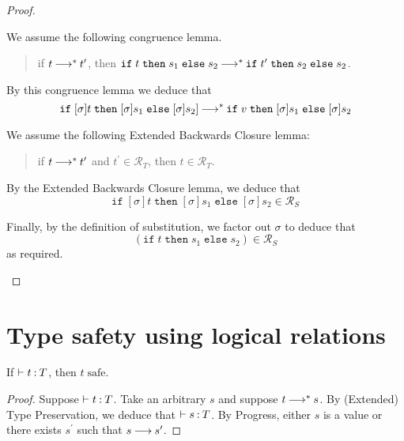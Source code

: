 \documentclass[11pt,letterpaper]{article}
\renewcommand{\R}{\mathcal{R}}
\newcommand{\ifthenelse}[3]{%
  \mathtt{if}\;#1\;\mathtt{then}\;#2\;\mathtt{else}\;#3%
}
\begin{document}
\begin{enumerate}
\begin{proof}
\begin{description}
          We assume the following congruence lemma.
          \begin{quote}
            if $t \mathbin{\longrightarrow}^* t^\prime$, then
            $\ifthenelse{t}{s_1}{s_2}
            \evalto^* \ifthenelse{t^\prime}{s_2}{s_2}$.
          \end{quote}

          By this congruence lemma we deduce that
          \begin{equation*}
            \ifthenelse{[\sigma]t}{[\sigma]s_1}{[\sigma]s_2]}
            \evalto^*
            \ifthenelse{v}{[\sigma]s_1}{[\sigma]s_2}
          \end{equation*}

          We assume the following Extended Backwards Closure lemma:
          \begin{quote}
            if $t \mathbin{\longrightarrow}^* t^\prime$ and $t^\prime \in \R_T$,
            then $t \in \R_T$.
          \end{quote}

          By the Extended Backwards Closure lemma, we deduce that
          \begin{equation*}
            \ifthenelse{[\sigma]t}{[\sigma]s_1}{[\sigma]s_2} \in \R_S
          \end{equation*}

          Finally, by the definition of substitution, we factor out $\sigma$
          to deduce that
          \begin{equation*}
            [\sigma](\ifthenelse{t}{s_1}{s_2}) \in \R_S
          \end{equation*}
          as required.
      \end{description}
    \end{proof}
\end{enumerate}

\section{Type safety using logical relations}

\newcommand{\safe}{\ensuremath{\;\text{safe}}}

\begin{thm}
  If $\vdash t \mathbin{:} T$, then $t \safe$.
\end{thm}

\begin{proof}
  Suppose $\vdash t \mathbin{:} T$.
  Take an arbitrary $s$ and suppose $t \mathbin{\longrightarrow}^* s$.
  By (Extended) Type Preservation,
  we deduce that $\vdash s \mathbin{:} T$.
  By Progress,
  either $s$ is a value
  or there exists $s^\prime$ such that $s \mathbin{\longrightarrow} s^\prime$.
\end{proof}
\end{document}
